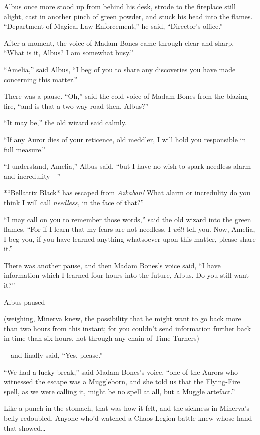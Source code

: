 Albus once more stood up from behind his desk, strode to the fireplace
still alight, cast in another pinch of green powder, and stuck his head
into the flames. ``Department of Magical Law Enforcement,'' he said,
``Director's office.''

After a moment, the voice of Madam Bones came through clear and sharp,
``What is it, Albus? I am somewhat busy.''

``Amelia,'' said Albus, ``I beg of you to share any discoveries you have
made concerning this matter.''

There was a pause. ``Oh,'' said the cold voice of Madam Bones from the
blazing fire, ``and is that a two-way road then, Albus?''

``It may be,'' the old wizard said calmly.

``If any Auror dies of your reticence, old meddler, I will hold you
responsible in full measure.''

``I understand, Amelia,'' Albus said, ``but I have no wish to spark
needless alarm and incredulity---''

*``Bellatrix Black* has escaped from \emph{Azkaban!} What alarm or
incredulity do you think I will call \emph{needless,} in the face of
that?''

``I may call on you to remember those words,'' said the old wizard into
the green flames. ``For if I learn that my fears are not needless, I
\emph{will} tell you. Now, Amelia, I beg you, if you have learned
anything whatsoever upon this matter, please share it.''

There was another pause, and then Madam Bones's voice said, ``I have
information which I learned four hours into the future, Albus. Do you
still want it?''

Albus paused---

(weighing, Minerva knew, the possibility that he might want to go back
more than two hours from this instant; for you couldn't send information
further back in time than six hours, not through any chain of
Time-Turners)

---and finally said, ``Yes, please.''

``We had a lucky break,'' said Madam Bones's voice, ``one of the Aurors
who witnessed the escape was a Muggleborn, and she told us that the
Flying-Fire spell, as we were calling it, might be no spell at all, but
a Muggle artefact.''

Like a punch in the stomach, that was how it felt, and the sickness in
Minerva's belly redoubled. Anyone who'd watched a Chaos Legion battle
knew whose hand that showed\ldots{}

